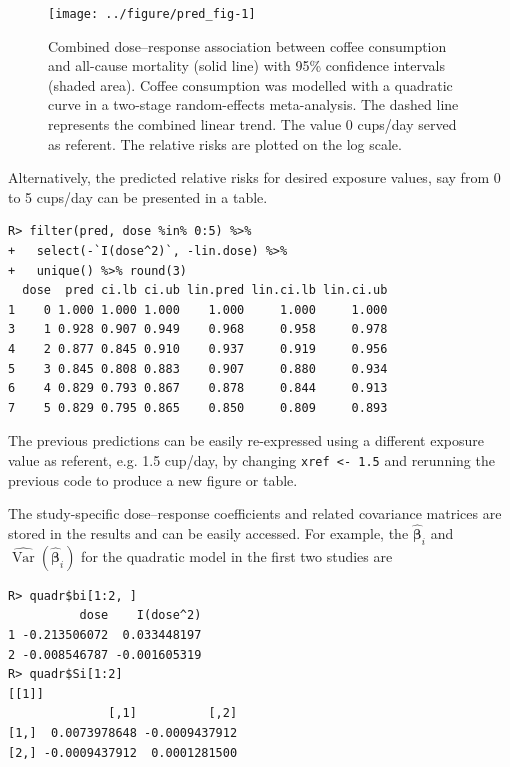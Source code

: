 \documentclass[11pt,a4paper,twoside,openany]{book}\usepackage{knitr}
\DeclareMathOperator{\Var}{Var}
\begin{document}
{{\begin{knitrout}
\begin{figure}[ht!]
{\centering \texttt{[image: ../figure/pred\_fig-1]} 

}

\caption[Combined dose--response association between coffee consumption and all-cause mortality (solid line) with 95\% confidence intervals (shaded area)]{Combined dose--response association between coffee consumption and all-cause mortality (solid line) with 95\% confidence intervals (shaded area). Coffee consumption was modelled with a quadratic curve in a two-stage random-effects meta-analysis. The dashed line represents the combined linear trend. The value 0 cups/day served as referent. The relative risks are plotted on the log scale.}\label{fig:pred_fig}
\end{figure}


\end{knitrout}

\noindent Alternatively, the predicted relative risks for desired exposure values, say from 0 to 5 cups/day can be presented in a table.

\begin{knitrout}\footnotesize
{}\color{fgcolor}\begin{kframe}
\begin{verbatim}
R> filter(pred, dose %in% 0:5) %>%
+   select(-`I(dose^2)`, -lin.dose) %>% 
+   unique() %>% round(3)
  dose  pred ci.lb ci.ub lin.pred lin.ci.lb lin.ci.ub
1    0 1.000 1.000 1.000    1.000     1.000     1.000
3    1 0.928 0.907 0.949    0.968     0.958     0.978
4    2 0.877 0.845 0.910    0.937     0.919     0.956
5    3 0.845 0.808 0.883    0.907     0.880     0.934
6    4 0.829 0.793 0.867    0.878     0.844     0.913
7    5 0.829 0.795 0.865    0.850     0.809     0.893
\end{verbatim}
\end{kframe}
\end{knitrout}

\noindent The previous predictions can be easily re-expressed using a different exposure value as referent, e.g. 1.5 cup/day, by changing \texttt{xref <- 1.5} and rerunning the previous code to produce a new figure or table.

The study-specific dose--response coefficients and related covariance matrices are stored in the results and can be easily accessed. For example, the $\boldsymbol{\hat \beta}_i$ and $\widehat{\Var} \left( \boldsymbol{\hat \beta}_i \right)$ for the quadratic model in the first two studies are

\begin{knitrout}\footnotesize
{}\color{fgcolor}\begin{kframe}
\begin{verbatim}
R> quadr$bi[1:2, ]
          dose    I(dose^2)
1 -0.213506072  0.033448197
2 -0.008546787 -0.001605319
R> quadr$Si[1:2]
[[1]]
              [,1]          [,2]
[1,]  0.0073978648 -0.0009437912
[2,] -0.0009437912  0.0001281500


\end{verbatim}
\end{kframe}
\end{knitrout}}}
\end{document}
